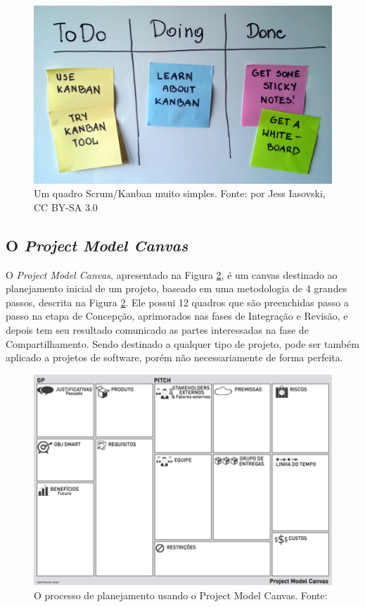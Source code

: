 \documentclass[a4]{report}
\newcommand{\othersize}{0.7\linewidth}
\begin{document}
\begin{figure}
    \centering
    \includegraphics[width=\othersize]{imagens/Simple-kanban-board-.jpg}
    \caption{Um quadro Scrum/Kanban muito simples. Fonte:  por Jess Iasovski, CC BY-SA 3.0 }
    \label{fig:kanban}
\end{figure}

\subsection{O \textit{Project Model Canvas}}

O \textit{Project Model Canvas}\citep{finocchio:2013}, apresentado na Figura \ref{fig:pmcp}, é um canvas destinado ao planejamento inicial de um projeto, baseado em uma metodologia de 4 grandes passos, descrita na Figura \ref{fig:pmcp}. Ele possui 12 quadros que são preenchidas passo a passo na etapa de Concepção,  aprimorados nas fases de Integração e Revisão, e depois tem seu resultado comunicado as partes interessadas na fase de Compartilhamento. Sendo destinado a qualquer tipo de projeto, pode ser também aplicado a projetos de software, porém não necessariamente de forma perfeita.

\begin{figure}
    \centering
    \includegraphics[width=\othersize]{imagens/ProjectMdoel Canvas.png}
    \caption{O processo de planejamento usando o Project Model Canvas. Fonte: \citet{finocchio:2013}}
    \label{fig:pmcp}
\end{figure}
\end{document}
